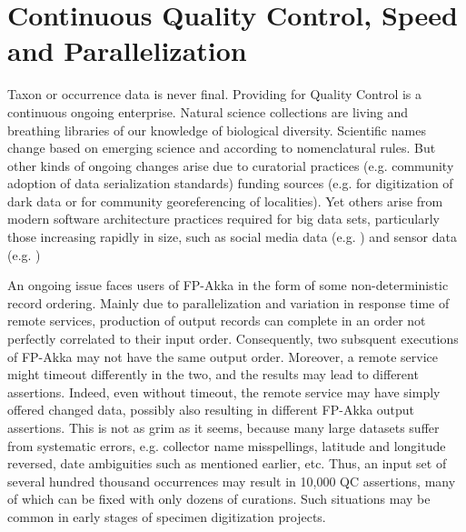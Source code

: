 \documentclass{article}
\begin{document}



\section{Continuous Quality Control, Speed and Parallelization}
Taxon or occurrence data is never final. Providing for Quality Control is a continuous ongoing enterprise. Natural science collections are living and breathing libraries of our knowledge of biological diversity.  Scientific names change based on emerging science and according to nomenclatural rules.  But other kinds of ongoing changes arise due to curatorial practices (e.g. community adoption of data serialization standards) funding sources (e.g. for digitization of dark data or for community georeferencing of localities). Yet others arise from modern software architecture practices required for big data sets, particularly those increasing rapidly in size, such as social media data (e.g.\citep{Cai2015, Immonen2015} ) and sensor data (e.g. \citep{Campbell01072013})

An ongoing issue faces users of FP-Akka in the form of some non-deterministic record ordering.  Mainly due to parallelization and variation in response time of remote services, production of output records can complete in an order not perfectly correlated to their input order. Consequently,  two subsquent executions of FP-Akka may not have the same output order. Moreover, a remote service might timeout differently in the two, and the results may lead to different assertions.  Indeed, even without timeout, the remote service may have simply offered changed data, possibly also resulting in different FP-Akka output assertions.  This is not as grim as it seems, because many large datasets suffer from systematic errors, e.g. collector name misspellings, latitude and longitude reversed, date ambiguities such as mentioned earlier, etc.  Thus, an input set of several hundred thousand occurrences may result in 10,000 QC assertions, many of which can be fixed with only dozens of curations. Such situations may be common in early stages of specimen digitization projects.
\end{document}
